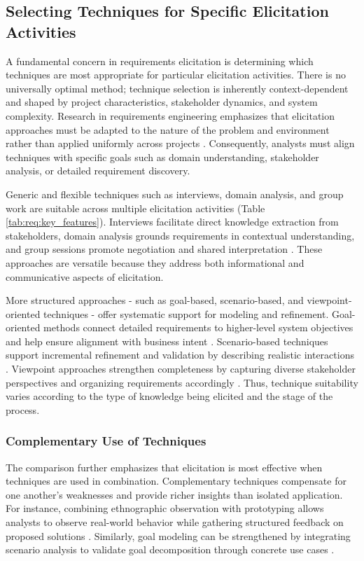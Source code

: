 \subsection{Selecting Techniques for Specific Elicitation Activities}

A fundamental concern in requirements elicitation is determining which techniques are most appropriate for particular elicitation activities. There is no universally optimal method; technique selection is inherently context-dependent and shaped by project characteristics, stakeholder dynamics, and system complexity. Research in requirements engineering emphasizes that elicitation approaches must be adapted to the nature of the problem and environment rather than applied uniformly across projects \cite{Nuseibeh2000}. Consequently, analysts must align techniques with specific goals such as domain understanding, stakeholder analysis, or detailed requirement discovery.

Generic and flexible techniques such as interviews, domain analysis, and group work are suitable across multiple elicitation activities (Table \ref{tab:req:key_features}). Interviews facilitate direct knowledge extraction from stakeholders, domain analysis grounds requirements in contextual understanding, and group sessions promote negotiation and shared interpretation \cite{Gottesdiener2002,Sutcliffe1998}. These approaches are versatile because they address both informational and communicative aspects of elicitation.

More structured approaches - such as goal-based, scenario-based, and viewpoint-oriented techniques - offer systematic support for modeling and refinement. Goal-oriented methods connect detailed requirements to higher-level system objectives and help ensure alignment with business intent \cite{Dardenne1993}. Scenario-based techniques support incremental refinement and validation by describing realistic interactions \cite{Potts1994}. Viewpoint approaches strengthen completeness by capturing diverse stakeholder perspectives and organizing requirements accordingly \cite{Sommerville1998}. Thus, technique suitability varies according to the type of knowledge being elicited and the stage of the process.

\subsubsection{Complementary Use of Techniques}

The comparison further emphasizes that elicitation is most effective when techniques are used in combination. Complementary techniques compensate for one another's weaknesses and provide richer insights than isolated application. For instance, combining ethnographic observation with prototyping allows analysts to observe real-world behavior while gathering structured feedback on proposed solutions \cite{Sommerville2001}. Similarly, goal modeling can be strengthened by integrating scenario analysis to validate goal decomposition through concrete use cases \cite{Rolland1998}.

